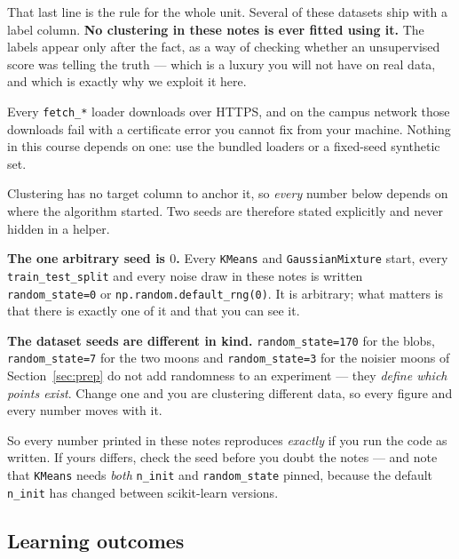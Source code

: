 \documentclass[11pt]{article}
\begin{document}
That last line is the rule for the whole unit. Several of these datasets ship
with a label column. \textbf{No clustering in these notes is ever fitted using
it.} The labels appear only after the fact, as a way of checking whether an
unsupervised score was telling the truth --- which is a luxury you will not
have on real data, and which is exactly why we exploit it here.

\begin{caution}
Every \texttt{fetch\_*} loader downloads over HTTPS, and on the campus network
those downloads fail with a certificate error you cannot fix from your
machine. Nothing in this course depends on one: use the bundled loaders or a
fixed-seed synthetic set.
\end{caution}

\begin{keyidea}
Clustering has no target column to anchor it, so \emph{every} number below
depends on where the algorithm started. Two seeds are therefore stated
explicitly and never hidden in a helper.

\textbf{The one arbitrary seed is $0$.} Every \texttt{KMeans} and
\texttt{GaussianMixture} start, every \texttt{train\_test\_split} and every
noise draw in these notes is written \texttt{random\_state=0} or
\texttt{np.random.default\_rng(0)}. It is arbitrary; what matters is that
there is exactly one of it and that you can see it.

\textbf{The dataset seeds are different in kind.} \texttt{random\_state=170}
for the blobs, \texttt{random\_state=7} for the two moons and
\texttt{random\_state=3} for the noisier moons of
Section~\ref{sec:prep} do not add randomness to an experiment --- they
\emph{define which points exist}. Change one and you are clustering different
data, so every figure and every number moves with it.

So every number printed in these notes reproduces \emph{exactly} if you run
the code as written. If yours differs, check the seed before you doubt the
notes --- and note that \texttt{KMeans} needs \emph{both} \texttt{n\_init} and
\texttt{random\_state} pinned, because the default \texttt{n\_init} has
changed between scikit-learn versions.
\end{keyidea}

\subsection{Learning outcomes}
\end{document}
